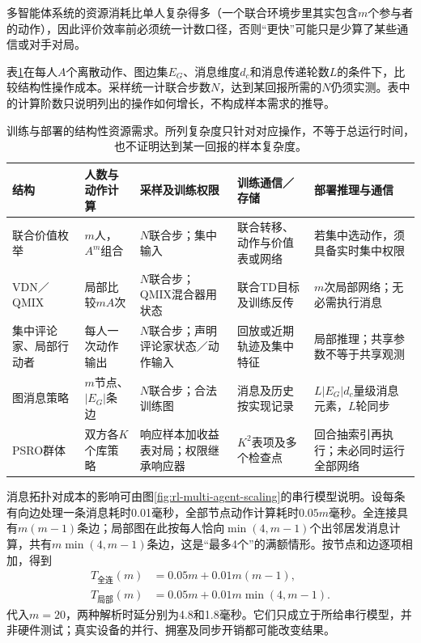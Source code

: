 多智能体系统的资源消耗比单人复杂得多（一个联合环境步里其实包含$m$个参与者的动作），因此评价效率前必须统一计数口径，否则“更快”可能只是少算了某些通信或对手对局。

表\ref{tab:rl-multi-agent-resources}在每人$A$个离散动作、图边集$E_G$、消息维度$d_c$和消息传递轮数$L$的条件下，比较结构性操作成本。采样统一计联合步数$N$，达到某回报所需的$N$仍须实测。表中的计算阶数只说明列出的操作如何增长，不构成样本需求的推导。

\begin{table}[htbp]
 \centering
 \begin{tabularx}{\linewidth}{@{}l >{\raggedright\arraybackslash}X >{\raggedright\arraybackslash}X >{\raggedright\arraybackslash}X >{\raggedright\arraybackslash}X@{}}
 \toprule
 结构 & 人数与动作计算 & 采样及训练权限 & 训练通信／存储 & 部署推理与通信\\
 \midrule
 联合价值枚举 & $m$人，$A^m$组合 & $N$联合步；集中输入 & 联合转移、动作与价值表或网络 & 若集中选动作，须具备实时集中权限\\
 VDN／QMIX & 局部比较$mA$次 & $N$联合步；QMIX混合器用状态 & 联合TD目标及训练反传 & $m$次局部网络；无必需执行消息\\
 集中评论家、局部行动者 & 每人一次动作输出 & $N$联合步；声明评论家状态／动作输入 & 回放或近期轨迹及集中特征 & 局部推理；共享参数不等于共享观测\\
 图消息策略 & $m$节点、$|E_G|$条边 & $N$联合步；合法训练图 & 消息及历史按实现记录 & $L|E_G|d_c$量级消息元素，$L$轮同步\\
 PSRO群体 & 双方各$K$个库策略 & 响应样本加收益表对局；权限继承响应器 & $K^2$表项及多个检查点 & 回合抽索引再执行；未必同时运行全部网络\\
 \bottomrule
 \end{tabularx}
 \caption{训练与部署的结构性资源需求。所列复杂度只针对对应操作，不等于总运行时间，也不证明达到某一回报的样本复杂度。}
 \label{tab:rl-multi-agent-resources}
\end{table}

消息拓扑对成本的影响可由图\ref{fig:rl-multi-agent-scaling}的串行模型说明。设每条有向边处理一条消息耗时0.01毫秒，全部节点动作计算耗时$0.05m$毫秒。全连接具有$m(m-1)$条边；局部图在此按每人恰向$\min(4,m-1)$个出邻居发消息计算，共有$m\min(4,m-1)$条边，这是“最多4个”的满额情形。按节点和边逐项相加，得到
\[
 \begin{aligned}
 T_{\text{全连}}(m)&=0.05m+0.01m(m-1),\\
 T_{\text{局部}}(m)&=0.05m+0.01m\min(4,m-1).
 \end{aligned}
\]
代入$m=20$，两种解析时延分别为4.8和1.8毫秒。它们只成立于所给串行模型，并非硬件测试；真实设备的并行、拥塞及同步开销都可能改变结果。

